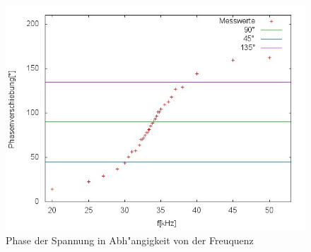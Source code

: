 	\begin{figure}[htbp]
		\centering
		\includegraphics[width = 12cm]{img/graph_d.jpg}
		\caption{Phase der Spannung in Abh"angigkeit von der Freuquenz}
		\label{phase}
	\end{figure}

	